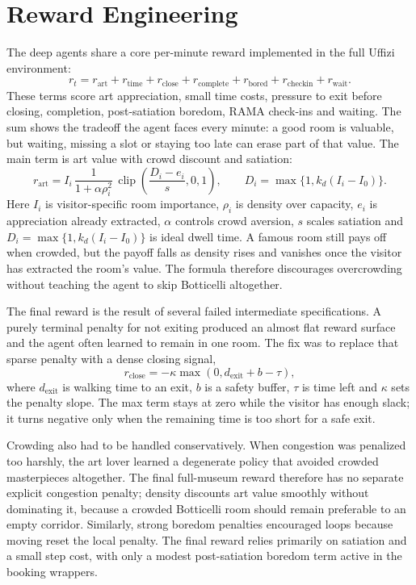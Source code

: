 \documentclass[11pt]{article}
\newcommand{\added}[1]{{\color{green!50!black}#1}}
\begin{document}
\section{Reward Engineering}

The deep agents share a core per-minute reward implemented in the full Uffizi environment:
\[
r_t =
r_{\text{art}}+r_{\text{time}}+r_{\text{close}}+r_{\text{complete}}
+r_{\text{bored}}+r_{\text{checkin}}+r_{\text{wait}}.
\]
\added{These terms score art appreciation, small time costs, pressure to exit before closing,
completion, post-satiation boredom, RAMA check-ins and waiting. The sum shows the tradeoff the agent
faces every minute: a good room is valuable, but waiting, missing a slot or staying too late can erase
part of that value.}
The main term is art value with crowd discount and satiation:
\[
r_{\text{art}} =
I_i\,
\frac{1}{1+\alpha \rho_i^2}\,
\operatorname{clip}\!\left(\frac{D_i-e_i}{s},0,1\right),
\qquad
D_i=\max\{1,k_d(I_i-I_0)\}.
\]
Here $I_i$ is visitor-specific room importance, $\rho_i$ is density over capacity, $e_i$ is
appreciation already extracted, $\alpha$ controls crowd aversion, $s$ scales satiation and
$D_i=\max\{1,k_d(I_i-I_0)\}$ is ideal dwell time. A famous room still pays off when crowded, but the
payoff falls as density rises and vanishes once the visitor has extracted the room's value. The
formula therefore discourages overcrowding without teaching the agent to skip Botticelli altogether.

The final reward is the result of several failed intermediate specifications. A purely terminal
penalty for not exiting produced an almost flat reward surface and the agent often learned to
remain in one room. The fix was to replace that sparse penalty with a dense closing signal,
\[
r_{\text{close}}=-\kappa\max(0,d_{\text{exit}}+b-\tau),
\]
where $d_{\text{exit}}$ is walking time to an exit, $b$ is a safety buffer, $\tau$ is time left and
$\kappa$ sets the penalty slope. The max term stays at zero while the visitor has enough slack; it
turns negative only when the remaining time is too short for a safe exit.

Crowding also had to be handled conservatively. When congestion was penalized too harshly, the art
lover learned a degenerate policy that avoided crowded masterpieces altogether. The final full-museum
reward therefore has no separate explicit congestion penalty; density discounts art value smoothly
without dominating it, because a crowded Botticelli room should remain preferable to an empty
corridor. Similarly, strong boredom penalties encouraged loops because moving reset the local penalty.
The final reward relies primarily on satiation and a small step cost, with only a modest
post-satiation boredom term active in the booking wrappers.
\end{document}
